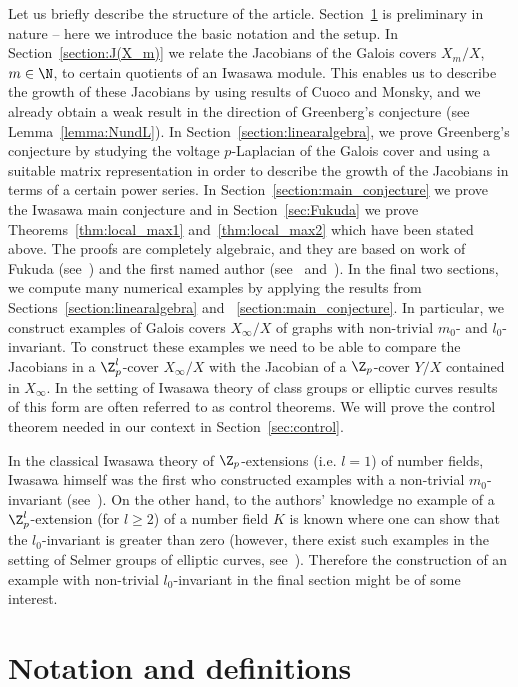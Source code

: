 Let us briefly describe the structure of the article. Section~\ref{section:notation} is preliminary in nature -- here we introduce the basic notation and the setup. In Section~\ref{section:J(X_m)} we relate the Jacobians of the Galois covers $X_m/X$, ${m \in \N}$, to certain quotients of an Iwasawa module. This enables us to describe the growth of these Jacobians by using results of Cuoco and Monsky, and we already obtain a weak result in the direction of Greenberg's conjecture (see Lemma~\ref{lemma:NundL}). In Section~\ref{section:linearalgebra}, we prove Greenberg's conjecture by studying the voltage $p$-Laplacian of the Galois cover and using a suitable matrix representation in order to describe the growth of the Jacobians in terms of a certain power series. In Section~\ref{section:main_conjecture} we prove the Iwasawa main conjecture and in Section~\ref{sec:Fukuda} we prove Theorems~\ref{thm:local_max1} and~\ref{thm:local_max2} which have been stated above. The proofs are completely algebraic, and they are based on work of Fukuda (see~\cite{fukuda}) and the first named author (see~\cite{local_beh} and~\cite{local_max}). In the final two sections, we compute many numerical examples by applying the results from Sections~\ref{section:linearalgebra} and ~\ref{section:main_conjecture}. In particular, we construct examples of Galois covers $X_\infty/X$ of graphs with non-trivial $m_0$- and $l_0$-invariant. To construct these examples we need to be able to compare the Jacobians in a $\Z_p^l$-cover $X_\infty/X$ with the Jacobian of a $\Z_p$-cover $Y/X$ contained in $X_\infty$. In the setting of Iwasawa theory of class groups or elliptic curves results of this form are often referred to as control theorems. We will prove the control theorem needed in our context in Section~\ref{sec:control}. 

In the classical Iwasawa theory of $\Z_p$-extensions (i.e. ${l = 1}$) of number fields, Iwasawa himself was the first who constructed examples with a non-trivial $m_0$-invariant (see~\cite{iwasawa_mu}). On the other hand, to the authors' knowledge no example of a $\Z_p^l$-extension (for $l\ge 2$) of a number field $K$ is known where one can show that the $l_0$-invariant is greater than zero (however, there exist such examples in the setting of Selmer groups of elliptic curves, see~\cite{kleine-matar}). Therefore the construction of an example with non-trivial $l_0$-invariant in the final section might be of some interest. 

\section{Notation and definitions} \label{section:notation} 
